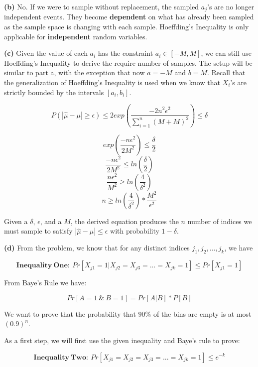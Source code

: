 \documentclass[11pt]{article}
\renewcommand\part[1]{\vspace{.10in}\textbf{(#1)}}
\begin{document}
\part{b} No. If we were to sample without replacement, the sampled $a_j$'s are no longer independent events. They become \textbf{dependent} on what has already been sampled as the sample space is changing with each sample. Hoeffding's Inequality is only applicable for \textbf{independent} random variables.

\part{c} Given the value of each $a_i$ has the constraint $a_i \in [-M, M]$, we can still use Hoeffding's Inequality to derive the require number of samples. The setup will be similar to part a, with the exception that now $a = -M$ and $b = M$. Recall that the generalization of Hoeffding's Inequality is used when we know that $X_i$'s are strictly bounded by the intervals $[a_i, b_i]$.

$$P(|\hat \mu - \mu| \geq \epsilon) \leq 2 exp(\frac{-2n^2\epsilon^2}{\sum_{i = 1}^n (M + M)^2}) \leq \delta$$

$$exp(\frac{-n\epsilon^2}{2M^2}) \leq \frac{\delta}{2}$$
$$\frac{-n\epsilon^2}{2M^2} \leq ln(\frac{\delta}{2})$$
$$\frac{n\epsilon^2}{M^2} \geq ln(\frac{4}{\delta^2})$$
$$n \geq ln(\frac{4}{\delta^2}) * \frac{M^2}{\epsilon^2}$$

Given a $\delta$, $\epsilon$, and a $M$, the derived equation produces the $n$ number of indices we must sample to satisfy $|\hat \mu - \mu| \leq \epsilon$ with probability $1 - \delta$.

\part{d} From the problem, we know that for any distinct indices $j_1, j_2,...,j_k$, we have

$$\mathbf{Inequality \ One: \ }Pr[X_{j1} = 1 | X_{j2} = X_{j3} = ... = X_{jk} = 1] \leq Pr[X_{j1} = 1]$$

From Baye's Rule we have:

$$Pr[A = 1 \ \& \ B = 1] = Pr[A | B] * P[B]$$

We want to prove that the probability that $90\%$ of the bins are empty is at most $(0.9)^n$.

As a first step, we will first use the given inequality and Baye's rule to prove:

$$\mathbf{Inequality \ Two: \ } Pr[X_{j1} = X_{j2} = X_{j3} = ... = X_{jk} = 1] \leq e^{-k}$$
\end{document}
